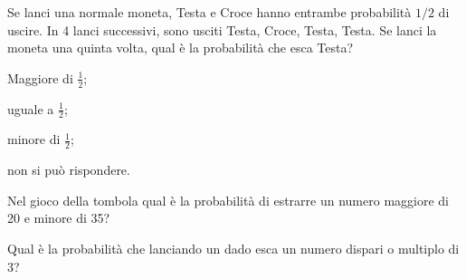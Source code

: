 \begin{esercizio}[2004~\Ast]
\label{ese:9.88}
Se lanci una normale moneta, Testa e Croce hanno entrambe probabilità $1/2$ di uscire. In 4 lanci successivi, sono usciti Testa, Croce, Testa, Testa. Se lanci la moneta una quinta volta, qual è la probabilità che esca Testa?
\begin{multicols}{2}
\begin{enumeratea}
\item Maggiore di $ \frac 1 2 $;
\item uguale a $ \frac 1 2 $;
\item minore di $ \frac 1 2 $;
\item non si può rispondere.
\end{enumeratea}
\end{multicols}
\end{esercizio}

\begin{esercizio}[2004~\Ast]
\label{ese:9.89}
Nel gioco della tombola qual è la probabilità di estrarre un numero maggiore di 20 e minore di 35?
\end{esercizio}

\begin{esercizio}[2004~\Ast]
\label{ese:9.90}
Qual è la probabilità che lanciando un dado esca un numero dispari o multiplo di 3?
\end{esercizio}

